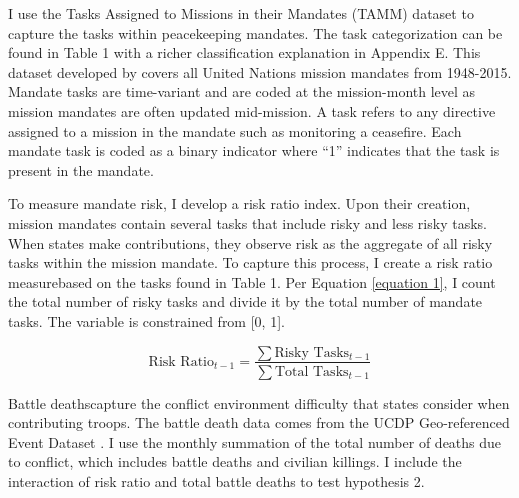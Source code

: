 \documentclass[12pt]{article}
\begin{document}
I use the Tasks Assigned to Missions in their Mandates (TAMM) dataset to capture the tasks within peacekeeping mandates. The task categorization can be found in Table 1 with a richer classification explanation in Appendix E. This dataset developed by \cite{lloyd2021} covers all United Nations mission mandates from 1948-2015. Mandate tasks are time-variant and are coded at the mission-month level as mission mandates are often updated mid-mission. A task refers to any directive assigned to a mission in the mandate such as monitoring a ceasefire. Each mandate task is coded as a binary indicator where ``1'' indicates that the task is present in the mandate. 

To measure mandate risk, I develop a risk ratio index. Upon their creation, mission mandates contain several tasks that include risky and less risky tasks. When states make contributions, they observe risk as the aggregate of all risky tasks within the mission mandate. To capture this process, I create a risk ratio measure\footnotemark[10] based on the tasks found in Table 1. Per Equation \ref{equation 1}, I count the total number of risky tasks and divide it by the total number of mandate tasks. The variable is constrained from [0, 1]. 


\begin{equation}
	\textrm{Risk Ratio$_{t-1}$} = \frac{\sum \textrm{Risky Tasks$_{t-1}$}}{\sum \textrm{Total Tasks$_{t-1}$}}
	\label{equation 1}
\end{equation}

Battle deaths\footnotemark[11] capture the conflict environment difficulty that states consider when contributing troops. The battle death data comes from the UCDP Geo-referenced Event Dataset \citep{sundberg2013}. I use the monthly summation of the total number of deaths due to conflict, which includes battle deaths and civilian killings. I include the interaction of risk ratio and total battle deaths to test hypothesis 2.\footnotemark[12]
\end{document}
